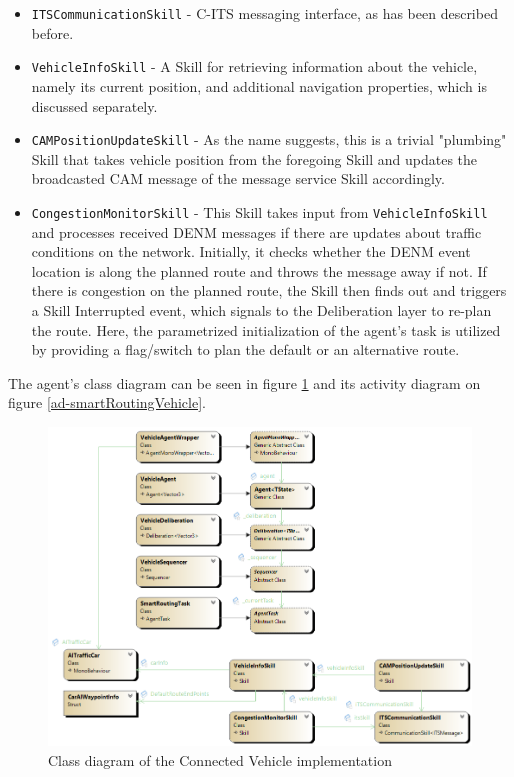 \documentclass[0main.tex]{subfiles}
\begin{document}
\begin{itemize}
    \item \texttt{ITSCommunicationSkill} - C-ITS messaging interface, as has been described before.
    \item \texttt{VehicleInfoSkill} - A Skill for retrieving information about the vehicle, namely 
    its current position, and additional navigation properties, which is discussed separately.
    \item \texttt{CAMPositionUpdateSkill} - As the name suggests, this is a trivial "plumbing" Skill 
    that takes vehicle position from the foregoing Skill and updates the broadcasted CAM message of 
    the message service Skill accordingly.
    \item \texttt{CongestionMonitorSkill} - This Skill takes input from \texttt{VehicleInfoSkill} and 
    processes received DENM messages if there are updates about traffic conditions on the network. 
    Initially, it checks whether the DENM event location is along the planned route and throws the 
    message away if not. If there is congestion on the planned route, the Skill then finds out and 
    triggers a Skill Interrupted event, which signals to the Deliberation layer to re-plan the route. 
    Here, the parametrized initialization of the agent's task is utilized by providing a flag/switch to 
    plan the default or an alternative route. 
\end{itemize}

The agent's class diagram can be seen in figure \ref{cd-smartRoutingVehicle} and its activity diagram 
on figure \ref{ad-smartRoutingVehicle}.

\begin{figure}[htbp]
    \centering
    \includegraphics[width=.9\textwidth]{cd-SmartRoutingAgent.png}
    \caption{Class diagram of the Connected Vehicle implementation}
    \label{cd-smartRoutingVehicle}
\end{figure}
\end{document}
